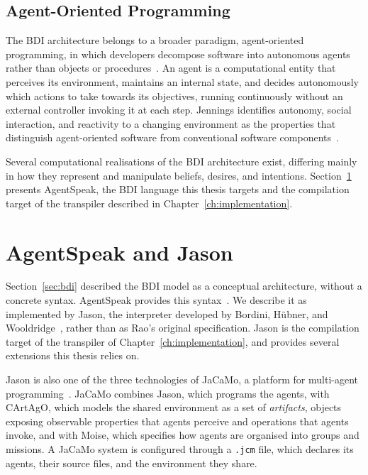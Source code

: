 \subsection{Agent-Oriented Programming}
\label{sec:aop}
 
The BDI architecture belongs to a broader paradigm, agent-oriented programming, in which developers decompose software into autonomous agents rather than objects or procedures~\cite{Jennings2000}. An agent is a computational entity that perceives its environment, maintains an internal state, and decides autonomously which actions to take towards its objectives, running continuously without an external controller invoking it at each step. Jennings identifies autonomy, social interaction, and reactivity to a changing environment as the properties that distinguish agent-oriented software from conventional software components~\cite{Jennings2000}.
 
Several computational realisations of the BDI architecture exist, differing mainly in how they represent and manipulate beliefs, desires, and intentions. Section~\ref{sec:agentspeak} presents AgentSpeak, the BDI language this thesis targets and the compilation target of the transpiler described in Chapter~\ref{ch:implementation}.
 
 
\section{AgentSpeak and Jason}
\label{sec:agentspeak}
 
Section~\ref{sec:bdi} described the BDI model as a conceptual architecture, without a concrete syntax. AgentSpeak provides this syntax~\cite{Rao1996}. We describe it as implemented by Jason, the interpreter developed by Bordini, H\"ubner, and Wooldridge~\cite{Bordini2007}, rather than as Rao's original specification. Jason is the compilation target of the transpiler of Chapter~\ref{ch:implementation}, and provides several extensions this thesis relies on. 

Jason is also one of the three technologies of JaCaMo, a platform for multi-agent programming~\cite{Boissier2013}. JaCaMo combines Jason, which programs the agents, with CArtAgO, which models the shared environment as a set of \emph{artifacts}, objects exposing observable properties that agents perceive and operations that agents invoke, and with Moise, which specifies how agents are organised into groups and missions. A JaCaMo system is configured through a \lstinline|.jcm| file, which declares its agents, their source files, and the environment they share.

